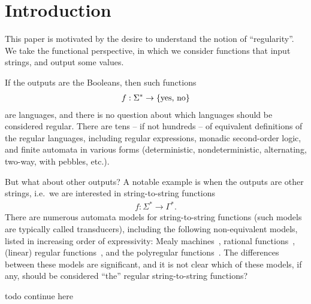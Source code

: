 \section{Introduction}
\label{sec:introduction}
This paper is motivated by the desire to understand the notion of  ``regularity''. We take the functional perspective, in which we consider functions that input strings, and output some values. 

If the outputs are the Booleans, then such functions
\begin{align*}
f : \Sigma^* \to \{\text{yes, no}\}
\end{align*}
are languages, and there is no question about which languages should be considered regular. There are tens -- if not hundreds -- of equivalent definitions of the regular languages, including regular expressions, monadic second-order logic, and finite automata in various forms (deterministic, nondeterministic, alternating, two-way, with pebbles, etc.).

But what about other outputs? A notable example is when the outputs are other strings, i.e.~we are interested in string-to-string functions 
\begin{align*}
f : \Sigma^* \to \Gamma^*.
\end{align*}
There are numerous automata models for string-to-string functions (such models are typically called transducers), including the following non-equivalent  models, listed in increasing order of expressivity:  Mealy machines~\cite[Section 2.1]{mealy1955method}, rational functions~\cite[Chapter IX.8]{Eilenberg74}, (linear) regular functions~\cite[p.~217]{engelfrietMSODefinableString2001}, and the  polyregular functions~\cite[p.~2]{polyregular-survey}. The differences between these models are significant, and it is not clear which of these models, if any, should be considered ``the'' regular string-to-string functions? 

\begin{center}
    todo continue here
\end{center}

